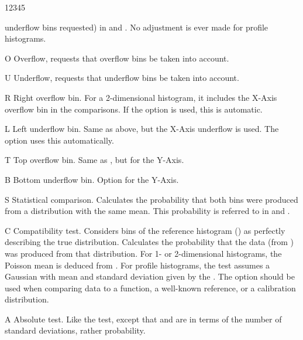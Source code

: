 \begin{DLtt}{12345}
\begin{DLtt}{1}
                       underflow bins requested) in  and .
                       No adjustment is ever made for profile histograms.
             \item[O]  Overflow, requests that overflow bins be taken into
                       account.
             \item[U]  Underflow, requests that underflow bins be taken into
                       account.
             \item[R]  Right overflow bin. For a 2-dimensional histogram, it
                       includes the X-Axis overflow bin in the comparisons.  
                       If the  option is used, this is automatic.
             \item[L]  Left underflow bin.  Same as above, but the X-Axis
                       underflow is used.  
                       The  option uses this automatically.
             \item[T]  Top overflow bin.  Same as , but for the Y-Axis.
             \item[B]  Bottom underflow bin.  Option  for the Y-Axis.
             \item[S]  Statistical comparison. Calculates the probability that
                       both bins were produced from a distribution with the 
                       same mean. 
                       This probability is referred to in  and 
                       .
             \item[C]  Compatibility test.  
                       Considers bins of the reference histogram () 
                       as perfectly describing the true distribution.
                       Calculates the probability that the data 
                       (from ) was produced from that distribution.   
                       For 1- or 2-dimensional histograms, the Poisson 
                       mean is deduced from . 
                       For profile histograms, the test assumes a Gaussian 
                       with mean and standard deviation given by the . 
                       The  option should be used when comparing data 
                       to a function, a well-known reference, or a
                       calibration distribution.
             \item[A]  Absolute test. Like the  test, except that
                        and  are in terms of the number 
                       of standard deviations, rather probability.

\end{DLtt}
\end{DLtt}
